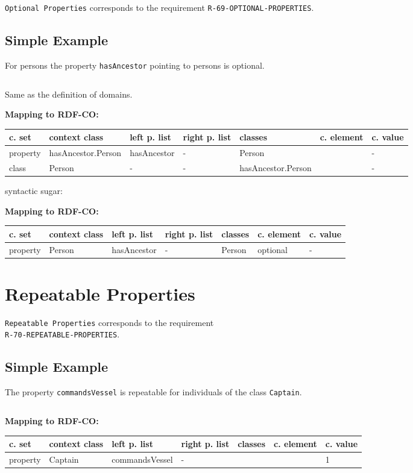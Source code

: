 \documentclass{llncs}
\newcommand{\ms}[1]{\texttt{#1}}
\newenvironment{gcotable}{
  \scriptsize
  \sffamily
  \vspace{0cm}
	\begin{center}
	\textbf{\vspace{0.4cm}Mapping to RDF-CO:} \\
  \begin{tabular}{l|l|l|l|l|l|l}
	\hline
  \textbf{c. set} & \textbf{context class} & \textbf{left p. list} & \textbf{right p. list} & \textbf{classes} & \textbf{c. element} & \textbf{c. value} \\
  \hline

}{
  \hline
  \end{tabular}
	\end{center}
}
\newenvironment{DL}{
\vspace{0cm}
	\begin{center}
  \begin{tabular}{r l}

}{
  \end{tabular}
	\end{center}
}
\begin{document}
\ms{Optional Properties} corresponds to the requirement \ms{R-69-OPTIONAL-PROPERTIES}.

\subsection{Simple Example}

For persons the property \ms{hasAncestor} pointing to persons is optional.

\begin{DL}
 \\
\end{DL}

Same as the definition of domains.

\begin{gcotable}
property &  hasAncestor.Person & hasAncestor & - & Person &  & - \\
class & Person & - & - &  hasAncestor.Person &  & - \\
\end{gcotable}	

syntactic sugar:

\begin{gcotable}
property & Person & hasAncestor & - & Person & optional & - \\
\end{gcotable}

\section{Repeatable Properties}

\ms{Repeatable Properties} corresponds to the requirement \\
\ms{R-70-REPEATABLE-PROPERTIES}.

\subsection{Simple Example}

The property \ms{commandsVessel} is repeatable for individuals of the class \ms{Captain}.

\begin{DL}

\end{DL}

\begin{gcotable}
property & Captain & commandsVessel & - &  &  & 1 \\
\end{gcotable}
\end{document}
